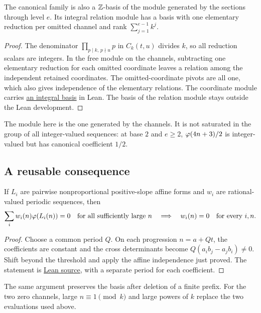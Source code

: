 \documentclass[11pt]{article}
\begin{document}
\begin{corollary}\label{cor:integral-normal-form}
The canonical family is also a $\mathbb{Z}$-basis of the module generated by the
sections through level $e$. Its integral relation module has a basis with
one elementary reduction per omitted channel and rank
$\sum_{j=1}^{e-1}k^j$.
\end{corollary}
\begin{proof}
The denominator $\prod_{p\mid k,\,p\nmid u}p$ in $C_k(t,u)$ divides $k$,
so all reduction scalars are integers. In the free module on the channels,
subtracting one elementary reduction for each omitted coordinate leaves a
relation among the independent retained coordinates. The omitted-coordinate
pivots are all one, which also gives independence of the elementary relations.
The coordinate module carries
\href{https://github.com/wcook04/plectis-erdos/blob/f36a98bf3d3e6f65f1074e3b800e3293d5b8a51a/ErdosProblems/Erdos249/PaperCompleteR7/KernelIntegral.lean#L138}{an integral basis}
in Lean. The basis of the relation module stays outside the Lean development.
\end{proof}
The module here is the one generated by the channels. It is not saturated
in the group of all integer-valued sequences: at base $2$ and $e\ge2$,
$\varphi(4n+3)/2$ is integer-valued but has canonical coefficient $1/2$.

\subsection{A reusable consequence}
\begin{corollary}\label{cor:periodic-freezing}
If $L_i$ are pairwise nonproportional positive-slope affine forms and $w_i$
are rational-valued periodic sequences, then
\[
 \sum_i w_i(n)\varphi(L_i(n))=0\quad\text{for all sufficiently large }n
 \quad\Longrightarrow\quad w_i(n)=0\quad\text{for every }i,n.
\]
\end{corollary}
\begin{proof}
Choose a common period $Q$. On each progression $n=a+Qt$, the coefficients
are constant and the cross determinants become $Q(a_ib_j-a_jb_i)\ne0$.
Shift beyond the threshold and apply the affine independence just proved.
The statement is \href{https://github.com/wcook04/plectis-erdos/blob/f36a98bf3d3e6f65f1074e3b800e3293d5b8a51a/ErdosProblems/Erdos249/PaperCompleteR7/PeriodicAndPulse.lean#L64}{Lean source},
with a separate period for each coefficient.
\end{proof}
The same argument preserves the basis after deletion of a finite prefix.
For the two zero channels, large $n\equiv1\pmod k$ and large powers of $k$
replace the two evaluations used above.
\end{document}
